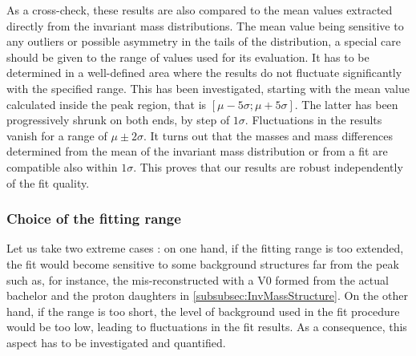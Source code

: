 As a cross-check, these results are also compared to the mean values extracted directly from the invariant mass distributions. The mean value being sensitive to any outliers or possible asymmetry in the tails of the distribution, a special care should be given to the range of values used for its evaluation. It has to be determined in a well-defined area where the results do not fluctuate significantly with the specified range. This has been investigated, starting with the mean value calculated inside the peak region, that is $\left[ \mu - 5 \sigma ; \mu + 5 \sigma \right]$. The latter has been progressively shrunk on both ends, by step of $1 \sigma$. Fluctuations in the results vanish for a range of $\mu \pm 2 \sigma$. It turns out that the masses and mass differences determined from the mean of the invariant mass distribution or from a fit are compatible also within $1 \sigma$. This proves that our results are robust independently of the fit quality.


\subsubsection{Choice of the fitting range}
\label{subsubsec:SystFittingRange}

Let us take two extreme cases : on one hand, if the fitting range is too extended, the fit would become sensitive to some background structures far from the peak such as, for instance, the mis-reconstructed \rmXi with a V0 formed from the actual bachelor and the proton daughters in \Sec\ref{subsubsec:InvMassStructure}. On the other hand, if the range is too short, the level of background used in the fit procedure would be too low, leading to fluctuations in the fit results. As a consequence, this aspect has to be investigated and quantified.

